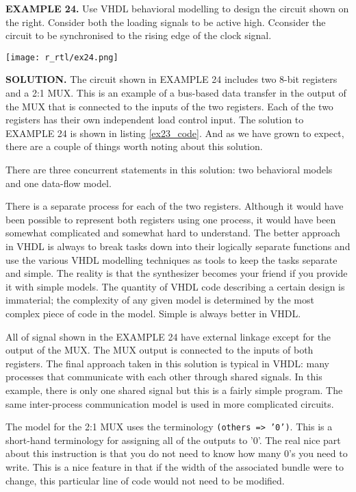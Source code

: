 \begin{leftbar}
\begin{minipage}[t]{0.5\textwidth}
\vspace{10pt}
\noindent
\textbf{EXAMPLE 24.}
Use VHDL behavioral modelling to design the circuit shown on the right. Consider both the loading signals to be active high. Cconsider the circuit to be synchronised to the rising edge of the clock signal. 
\end{minipage}
\begin{minipage}[t]{0.5\textwidth}
\vspace{0pt}\raggedright
    \centering
	\texttt{[image: r\_rtl/ex24.png]}
\end{minipage}
\end{leftbar}
\noindent
\textbf{SOLUTION.} The circuit shown in EXAMPLE 24 includes two 8-bit registers and a 2:1 MUX. This is an example of a bus-based data transfer in the output of the MUX that is connected to the inputs of the two registers. Each of the two registers has their own independent load control input. The solution to EXAMPLE 24 is shown in listing \ref{ex23_code}. And as we have grown to expect, there are a couple of things worth noting about this solution. 
\begin{my_list}
\item There are three concurrent statements in this solution: two behavioral models and one data-flow model. 

\item There is a separate process for each of the two registers. Although it would have been possible to represent both registers using one process, it would have been somewhat complicated and somewhat hard to understand. The better approach in VHDL is always to break tasks down into their logically separate functions and use the various VHDL modelling techniques as tools to keep the tasks separate and simple. The reality is that the synthesizer becomes your friend if you provide it with simple models. The quantity of VHDL code describing a certain design is immaterial; the complexity of any given model is determined by the most complex piece of code in the model. Simple is always better in VHDL.

\item All of signal shown in the EXAMPLE 24 have external linkage except for the output of the MUX. The MUX output is connected to the inputs of both registers. The final approach taken in this solution is typical in VHDL: many processes that communicate with each other through shared signals. In this example, there is only one shared signal but this is a fairly simple program. The same inter-process communication model is used in more complicated circuits.

\item The model for the 2:1 MUX uses the terminology \texttt{(others => '0')}. This is a short-hand terminology for assigning all of the outputs to '0'. The real nice part about this instruction is that you do not need to know how many 0’s you need to write. This is a nice feature in that if the width of the associated bundle were to change, this particular line of code would not need to be modified. 
\end{my_list}

